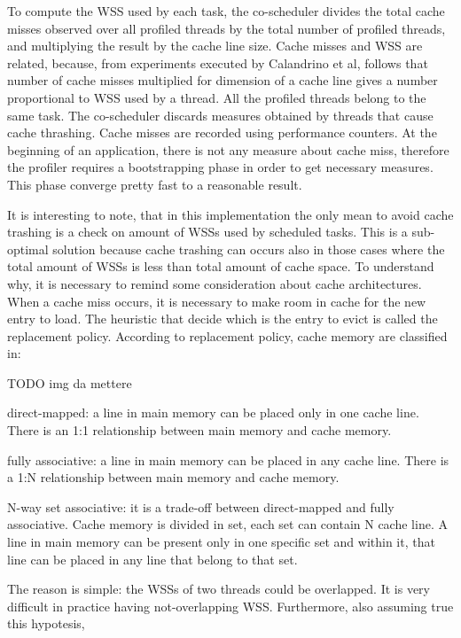 \begin{description}
To compute the WSS used by each task, the co-scheduler divides the total cache misses observed over all profiled threads by the total number of profiled 
threads, and multiplying the result by the cache line size. Cache misses and WSS are related, because, from experiments executed by Calandrino et al, 
follows that number of cache misses multiplied for dimension of a cache line gives a number proportional to WSS used by a thread. All the profiled threads 
belong to the same task. The co-scheduler discards measures obtained by threads that cause cache thrashing. Cache misses are recorded using performance 
counters. At the beginning of an application, there is not any measure about cache miss, therefore the profiler requires a bootstrapping phase in order to 
get necessary measures. This phase converge pretty fast to a reasonable result.

It is interesting to note, that in this implementation the only mean to avoid cache trashing is a check on amount of WSSs used by scheduled tasks.
This is a sub-optimal solution because cache trashing can occurs also in those cases where the total amount of WSSs is less than total amount of cache
space. To understand why, it is necessary to remind some consideration about cache architectures. When a cache miss occurs, it is necessary to make room 
in cache for the new entry to load. The heuristic that decide which is the entry to evict is called the replacement policy. According to replacement policy,
cache memory are classified in:

TODO img da mettere
\begin{description}
\item direct-mapped: a line in main memory can be placed only in one cache line. There is an 1:1 relationship between main memory and cache memory.
\item fully associative: a line in main memory can be placed in any cache line. There is a 1:N relationship between main memory and cache memory.
\item N-way set associative: it is a trade-off between direct-mapped and fully associative. Cache memory is divided in set, each set can contain N cache 
line. A line in main memory can be present only in one specific set and within it, that line can be placed in any line that belong to that set.
\end{description}

The reason is simple: the WSSs of two threads could be overlapped. It is very difficult in practice having not-overlapping WSS. Furthermore, also 
assuming true this hypotesis, 


\end{description}
